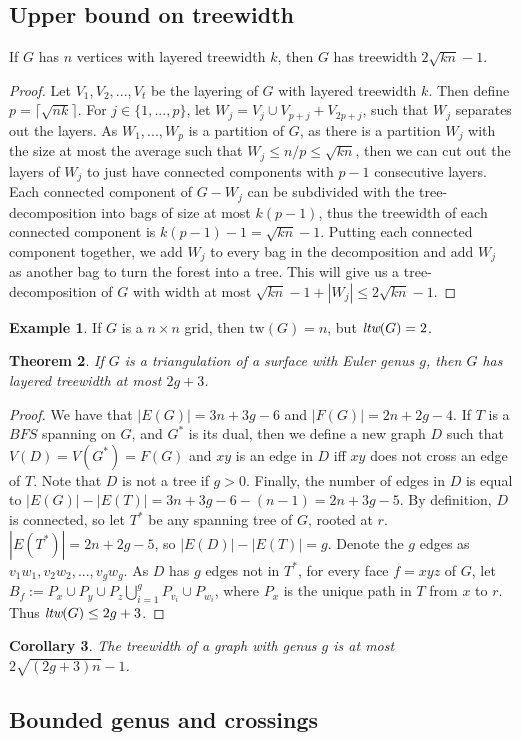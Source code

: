 \documentclass[]{article}
\newcommand{\tw}{\text{tw}}
\newtheorem{theorem}{Theorem}
\newtheorem{corollary}[theorem]{Corollary}
\theoremstyle{definition}
\newtheorem{example}[theorem]{Example}
\numberwithin{theorem}{section}
\numberwithin{equation}{section}
\begin{document}
\subsection{Upper bound on treewidth}
If $G$ has $n$ vertices with layered treewidth $k$, then $G$ has treewidth $2 \sqrt{kn} - 1$.
\begin{proof}
	Let $V_1, V_2, ..., V_t$ be the layering of $G$ with layered treewidth $k$. Then define $p = \lceil \sqrt{nk} \rceil$. For $j \in \lbrace 1, ..., p \rbrace$, let $W_j = V_j \cup V_{p + j} + V_{2p + j}$, such that $W_j$ separates out the layers. As $W_1, ..., W_p$ is a partition of $G$, as there is a partition $W_j$ with the size at most the average such that $W_j \leq n/p \leq \sqrt{kn}$, then we can cut out the layers of $W_j$ to just have connected components with $p-1$ consecutive layers. Each connected component of $G - W_j$ can be subdivided with the tree-decomposition into bags of size at most $k(p-1)$, thus the treewidth of each connected component is $k(p-1) - 1 = \sqrt{kn} - 1$. Putting each connected component together, we add $W_j$ to every bag in the decomposition and add $W_j$ as another bag to turn the forest into a tree. This will give us a tree-decomposition of $G$ with width at most $\sqrt{kn} - 1 + |W_j| \leq 2 \sqrt{kn} - 1$. 
\end{proof}

\begin{example}
	If $G$ is a $n \times n$ grid, then $\tw(G) = n$, but $\textit{ltw}(G) = 2$. 
\end{example}

\begin{theorem}
	If $G$ is a triangulation of a surface with Euler genus $g$, then $G$ has layered treewidth at most $2g + 3$. 
\end{theorem}

\begin{proof}
	We have that $|E(G)| = 3n + 3g - 6$ and $|F(G)| = 2n + 2g - 4$. If $T$ is a $BFS$ spanning on $G$, and $G^*$ is its dual, then we define a new graph $D$ such that $V(D) = V(G^*) = F(G)$ and $xy$ is an edge in $D$ iff $xy$ does not cross an edge of $T$. Note that $D$ is not a tree if $g > 0 $. Finally, the number of edges in $D$ is equal to $|E(G)| - |E(T)| = 3n + 3g - 6 - (n-1) = 2n + 3g - 5$. By definition, $D$ is connected, so let $T^*$ be any spanning tree of $G$, rooted at $r$. $|E(T^*)| = 2n + 2g - 5$, so $|E(D)| - |E(T)| = g$. Denote the $g$ edges as $v_1w_1, v_2w_2, ..., v_gw_g$. As $D$ has $g$ edges not in $T^*$, for every face $f = xyz$ of $G$, let $B_f := P_x \cup P_y \cup P_z \bigcup_{i = 1}^g P_{v_i} \cup P_{w_i}$, where $P_x$ is the unique path in $T$ from $x$ to $r$. Thus $\textit{ltw}(G) \leq 2g + 3$. 
\end{proof}
\begin{corollary}
	The treewidth of a graph with genus $g$ is at most $2\sqrt{(2g + 3) n } -1$. 
\end{corollary}

\subsection{Bounded genus and crossings}
\end{document}
